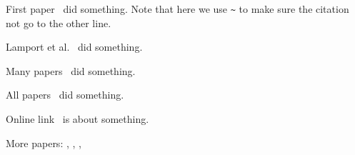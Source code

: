 First paper~\cite{goossens1994latex} did something. Note that here we use \verb|~| to make sure the citation not go to the other line. 

Lamport et al.~\cite{lamport1994latex} did something.

Many papers~\cite{makuuchi2000progress,yassin1994latex} did something.


All papers~\cite{makuuchi2000progress,yassin1994latex,
	goossens1994latex,lamport1994latex} did something.

Online link~\cite{onlineWindows} is about something.

More papers: \cite{colu92}, \cite{goossens1994latex}, \cite{jame76}, \cite{colu92,phil99,gree00,smit54}
